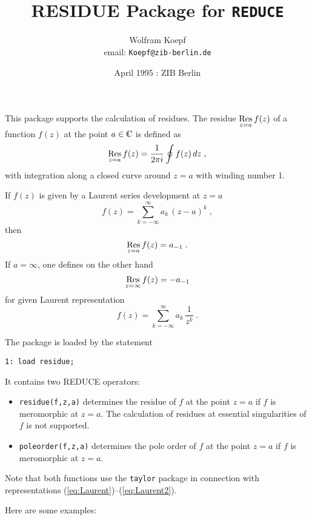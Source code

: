 \title{{\bf RESIDUE Package for {\tt REDUCE}}}
\author{Wolfram Koepf\\ email: {\tt Koepf@zib-berlin.de}}
\date{April 1995 : ZIB Berlin}

\maketitle
\def\Res{\mathop{\rm Res}\limits}
\newcommand{\C}{{\rm {\mbox{C{\llap{{\vrule height1.52ex}\kern.4em}}}}}}

This package supports the calculation of residues. The residue
$\Res_{z=a} f(z)$ of a function $f(z)$ at the point $a\in\C$ is defined
as
\[
\Res_{z=a} f(z)=
\frac{1}{2 \pi i}\oint f(z)\,dz
\;,
\]
with integration along a closed curve around $z=a$ with winding number 1.

If $f(z)$ is given by a Laurent series development at $z=a$
\[
f(z)=\sum_{k=-\infty}^\infty a_k\,(z-a)^k
\;,
\]
then
\begin{equation}
\Res\limits_{z=a} f(z)=a_{-1}
\;.
\label{eq:Laurent}
\end{equation}
If $a=\infty$, one defines on the other hand
\begin{equation}
\Res\limits_{z=\infty} f(z)=-a_{-1}
\label{eq:Laurent2}
\end{equation}
for given Laurent representation
\[
f(z)=\sum_{k=-\infty}^\infty a_k\,\frac{1}{z^k}
\;.
\]

The package is loaded by the statement

\begin{verbatim}
1: load residue;
\end{verbatim}

It contains two REDUCE operators:

\begin{itemize}
\item
{\tt residue(f,z,a)} determines the residue of $f$ at the point $z=a$
if $f$ is meromorphic at $z=a$. The calculation of residues at essential
singularities of $f$ is not supported.
\item
{\tt poleorder(f,z,a)} determines the pole order of $f$ at the point $z=a$
if $f$ is meromorphic at $z=a$.
\end{itemize}
Note that both functions use the {\tt taylor} package in
connection with representations (\ref{eq:Laurent})--(\ref{eq:Laurent2}).

Here are some examples:

